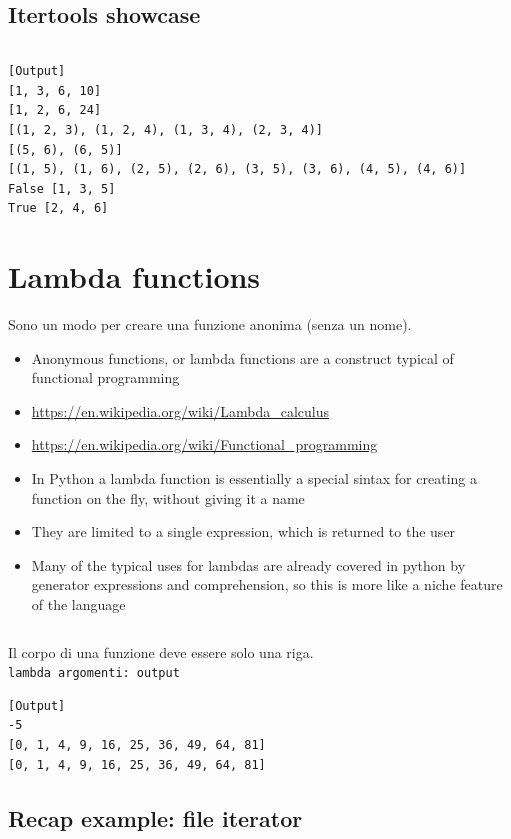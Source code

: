 \subsection{Itertools showcase}

\inputminted{python}{snippets/itertools_showcase.py}

\begin{verbatim}
[Output]
[1, 3, 6, 10]
[1, 2, 6, 24]
[(1, 2, 3), (1, 2, 4), (1, 3, 4), (2, 3, 4)]
[(5, 6), (6, 5)]
[(1, 5), (1, 6), (2, 5), (2, 6), (3, 5), (3, 6), (4, 5), (4, 6)]
False [1, 3, 5]
True [2, 4, 6]
\end{verbatim}

\section{Lambda functions}

Sono un modo per creare una funzione anonima (senza un nome).

  \begin{itemize}
    \item \alert{Anonymous functions}, or \alert{lambda functions} are a construct typical of \alert{functional programming}
    \item \url{https://en.wikipedia.org/wiki/Lambda_calculus}
    \item \url{https://en.wikipedia.org/wiki/Functional_programming}
    \item In Python a lambda function is essentially a special sintax for creating a function
          on the fly, without giving it a name
    \item They are limited to \alert{a single expression}, which is returned to the user
    \item Many of the typical uses for lambdas are already covered in python by generator expressions and comprehension,
          so this is more like a niche feature of the language
  \end{itemize}
  

\inputminted{python}{snippets/lambda.py}
Il corpo di una funzione deve essere solo una riga.\\
\texttt{lambda argomenti: output}
\begin{verbatim}
[Output]
-5
[0, 1, 4, 9, 16, 25, 36, 49, 64, 81]
[0, 1, 4, 9, 16, 25, 36, 49, 64, 81]
\end{verbatim}

\subsection{Recap example: file iterator}

